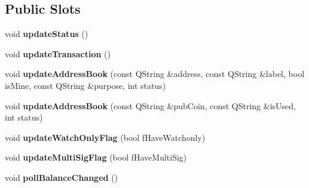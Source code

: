 \subsection*{Public Slots}
\begin{DoxyCompactItemize}
\item 
\mbox{\label{class_wallet_model_a89180a13e5b0c2ca7732164b9dec3806}} 
void {\bfseries update\+Status} ()
\item 
\mbox{\label{class_wallet_model_acf4f77d87e8b96a704c79b1d6cb53701}} 
void {\bfseries update\+Transaction} ()
\item 
\mbox{\label{class_wallet_model_ad70ea697efb4d5bdc4a834b538b4d535}} 
void {\bfseries update\+Address\+Book} (const Q\+String \&address, const Q\+String \&label, bool is\+Mine, const Q\+String \&purpose, int status)
\item 
\mbox{\label{class_wallet_model_a79a1fadfcf09ffd4a6cc1396c753f49e}} 
void {\bfseries update\+Address\+Book} (const Q\+String \&pub\+Coin, const Q\+String \&is\+Used, int status)
\item 
\mbox{\label{class_wallet_model_add90646b2ed03348dc2d6b415fa02a4e}} 
void {\bfseries update\+Watch\+Only\+Flag} (bool f\+Have\+Watchonly)
\item 
\mbox{\label{class_wallet_model_a6082bb403560a4bfb88d3a42e7132ab4}} 
void {\bfseries update\+Multi\+Sig\+Flag} (bool f\+Have\+Multi\+Sig)
\item 
\mbox{\label{class_wallet_model_a51469b2d95cfd4bc0a14ee456fca7b95}} 
void {\bfseries poll\+Balance\+Changed} ()
\end{DoxyCompactItemize}
